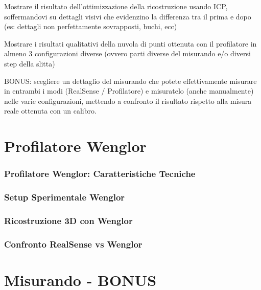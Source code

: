 \documentclass[aspectratio=169]{beamer}
\begin{document}
    \begin{frame}
        Mostrare il risultato dell’ottimizzazione della ricostruzione usando ICP, soffermandovi su dettagli 
visivi che evidenzino la differenza tra il prima e dopo (es: dettagli non perfettamente sovrapposti, 
buchi, ecc) 
    \end{frame}

    \begin{frame}
        Mostrare i risultati qualitativi della nuvola di punti ottenuta con il profilatore in almeno 3 
configurazioni diverse (ovvero parti diverse del misurando e/o diversi step della slitta) 
    \end{frame}

    \begin{frame}
        BONUS: scegliere un dettaglio del misurando che potete effettivamente misurare in entrambi i 
modi (RealSense / Profilatore) e misuratelo (anche manualmente) nelle varie configurazioni, 
mettendo a confronto il risultato rispetto alla misura reale ottenuta con un calibro.
    \end{frame}







\section{Profilatore Wenglor}

\begin{frame}
    \frametitle{Profilatore Wenglor: Caratteristiche Tecniche}
\end{frame}

\begin{frame}
    \frametitle{Setup Sperimentale Wenglor}
\end{frame}

\begin{frame}
    \frametitle{Ricostruzione 3D con Wenglor}
\end{frame}

\begin{frame}
    \frametitle{Confronto RealSense vs Wenglor}
\end{frame}

\section{Misurando - BONUS}
\end{document}

